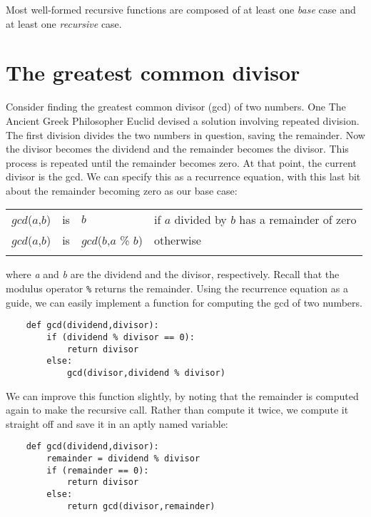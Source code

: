 Most well-formed recursive functions are composed of
at least one {\it base} case and at least one {\it recursive} case.

\section{The greatest common divisor}

Consider finding the greatest common divisor (gcd) of two numbers. One
The Ancient Greek Philosopher Euclid devised a solution involving
repeated division.
The first division divides the two
numbers in question, saving the remainder. Now the divisor becomes
the dividend and the
remainder becomes the divisor. This process is repeated until
the remainder becomes zero.
At that
point, the current divisor is the gcd.
We can specify this as a recurrence equation, with this last bit about
the remainder becoming zero as our base case:

\begin{center}
\begin{tabular}{lcll}
\T\toprule
    $gcd$($a$,$b$) & is & $b$ & if $a$ divided by $b$ has a remainder of zero\\
    $gcd$($a$,$b$) & is & $gcd$($b$,$a$ \% $b$) & otherwise \T\\
\T\bottomrule
\end{tabular}
\end{center}

where {\it a} and {\it b} are the dividend and the divisor, respectively.
Recall that the modulus operator \verb!%! returns the remainder.
Using the recurrence equation as a guide, we can easily implement
a function for computing the gcd of two numbers.

\begin{verbatim}
    def gcd(dividend,divisor):
        if (dividend % divisor == 0):
            return divisor
        else:
            gcd(divisor,dividend % divisor)
\end{verbatim}

We can improve this function slightly, by noting that
the remainder is computed again to make the recursive call.
Rather than compute it twice, we compute it straight off
and save it in an aptly named variable:

\begin{verbatim}
    def gcd(dividend,divisor):
        remainder = dividend % divisor
        if (remainder == 0):
            return divisor
        else:
            return gcd(divisor,remainder)
\end{verbatim}


